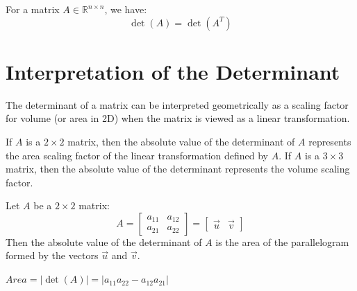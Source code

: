 \begin{theorem}
    For a matrix $A \in \mathbb{R}^{n \times n}$, we have:
    \[
        \det(A) = \det(A^T)
    \]
\end{theorem}

\section{Interpretation of the Determinant}
The determinant of a matrix can be interpreted geometrically as a scaling factor for volume (or area in 2D) when the matrix is viewed as a linear transformation.

\begin{theorem}
    If $A$ is a \(2 \times 2\) matrix, then the absolute value of the determinant of $A$ represents the area scaling factor of the linear transformation defined by $A$. If $A$ is a \(3 \times 3\) matrix, then the absolute value of the determinant represents the volume scaling factor.
\end{theorem}
\begin{eg}
    Let $A$ be a \(2 \times 2\) matrix:
    \[
        A = \begin{bmatrix}
            a_{11} & a_{12} \\
            a_{21} & a_{22}
        \end{bmatrix} = \begin{bmatrix}
            \vec{u} & \vec{v}
        \end{bmatrix}
    \]
    Then the absolute value of the determinant of $A$ is the area of the parallelogram formed by the vectors \(\vec{u}\) and \(\vec{v}\).
    \begin{center}
    \end{center}
    $Area = |\det(A)| = |a_{11}a_{22} - a_{12}a_{21}|$
\end{eg}

